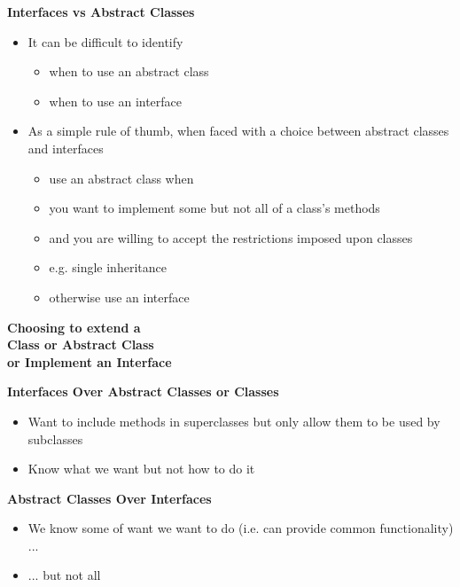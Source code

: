 \documentclass{beamer}
\begin{document}
\begin{frame}
\begin{center}
\textbf{Interfaces vs Abstract Classes}
\end{center}
\begin{itemize}
\item It can be difficult to identify 
\begin{itemize}
\item when to use an abstract class
\item when to use an interface
\end{itemize}
\item As a simple rule of thumb, when faced with a choice between abstract classes and interfaces
\begin{itemize}
\item use an abstract class when
\item you want to implement some but not all of a class's methods
\item and you are willing to accept the restrictions imposed upon classes
\item e.g. single inheritance
\item otherwise use an interface
\end{itemize}
\end{itemize}
\end{frame}

\begin{frame}
\begin{center}
\textbf{Choosing to extend a \\ Class or Abstract Class \\ or Implement an Interface}
\end{center}
\end{frame}

\begin{frame}
\begin{center}
\textbf{Interfaces Over Abstract Classes or Classes}
\end{center}
\begin{itemize}
\item Want to include methods in superclasses but only allow them to be used by subclasses
\item Know what we want but not how to do it
\end{itemize}
\end{frame}

\begin{frame}
\begin{center}
\textbf{Abstract Classes Over Interfaces}
\end{center}
\begin{itemize}
\item We know some of want we want to do (i.e. can provide common functionality) ...
\item ... but not all
\end{itemize}
\end{frame}
\end{document}
